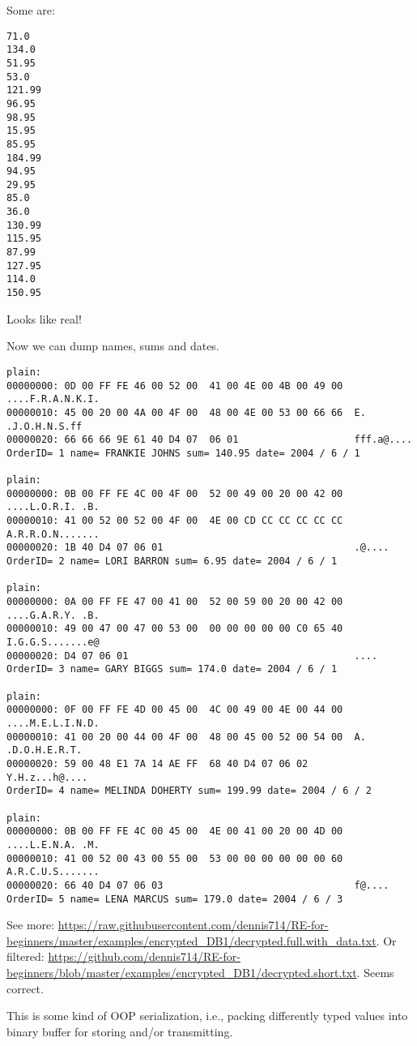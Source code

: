 Some are:

\begin{lstlisting}
71.0
134.0
51.95
53.0
121.99
96.95
98.95
15.95
85.95
184.99
94.95
29.95
85.0
36.0
130.99
115.95
87.99
127.95
114.0
150.95
\end{lstlisting}

Looks like real!

Now we can dump names, sums and dates.

\begin{lstlisting}
plain:
00000000: 0D 00 FF FE 46 00 52 00  41 00 4E 00 4B 00 49 00  ....F.R.A.N.K.I.
00000010: 45 00 20 00 4A 00 4F 00  48 00 4E 00 53 00 66 66  E. .J.O.H.N.S.ff
00000020: 66 66 66 9E 61 40 D4 07  06 01                    fff.a@....
OrderID= 1 name= FRANKIE JOHNS sum= 140.95 date= 2004 / 6 / 1

plain:
00000000: 0B 00 FF FE 4C 00 4F 00  52 00 49 00 20 00 42 00  ....L.O.R.I. .B.
00000010: 41 00 52 00 52 00 4F 00  4E 00 CD CC CC CC CC CC  A.R.R.O.N.......
00000020: 1B 40 D4 07 06 01                                 .@....
OrderID= 2 name= LORI BARRON sum= 6.95 date= 2004 / 6 / 1

plain:
00000000: 0A 00 FF FE 47 00 41 00  52 00 59 00 20 00 42 00  ....G.A.R.Y. .B.
00000010: 49 00 47 00 47 00 53 00  00 00 00 00 00 C0 65 40  I.G.G.S.......e@
00000020: D4 07 06 01                                       ....
OrderID= 3 name= GARY BIGGS sum= 174.0 date= 2004 / 6 / 1

plain:
00000000: 0F 00 FF FE 4D 00 45 00  4C 00 49 00 4E 00 44 00  ....M.E.L.I.N.D.
00000010: 41 00 20 00 44 00 4F 00  48 00 45 00 52 00 54 00  A. .D.O.H.E.R.T.
00000020: 59 00 48 E1 7A 14 AE FF  68 40 D4 07 06 02        Y.H.z...h@....
OrderID= 4 name= MELINDA DOHERTY sum= 199.99 date= 2004 / 6 / 2

plain:
00000000: 0B 00 FF FE 4C 00 45 00  4E 00 41 00 20 00 4D 00  ....L.E.N.A. .M.
00000010: 41 00 52 00 43 00 55 00  53 00 00 00 00 00 00 60  A.R.C.U.S.......
00000020: 66 40 D4 07 06 03                                 f@....
OrderID= 5 name= LENA MARCUS sum= 179.0 date= 2004 / 6 / 3
\end{lstlisting}

See more: \url{https://raw.githubusercontent.com/dennis714/RE-for-beginners/master/examples/encrypted_DB1/decrypted.full.with_data.txt}.
Or filtered: \url{https://github.com/dennis714/RE-for-beginners/blob/master/examples/encrypted_DB1/decrypted.short.txt}.
Seems correct.

This is some kind of \ac{OOP} serialization, i.e., packing differently typed values into binary buffer for storing and/or transmitting.

